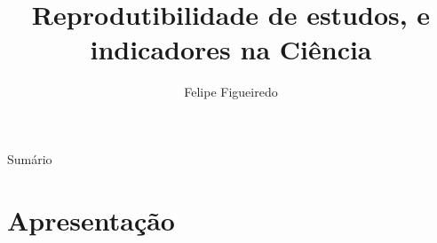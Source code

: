 \documentclass{beamer}
\title%
{Reprodutibilidade de estudos, e indicadores na Ciência}
\subtitle
{} %
\author%
{Felipe Figueiredo}%
\institute[INTO] %
{Instituto Nacional de Traumatologia e Ortopedia
}
\date%
{}
\begin{document}
\begin{frame}
  \titlepage
\end{frame}

\begin{frame}{Sumário}
  \tableofcontents
\end{frame}








\section{Apresentação}
\end{document}
